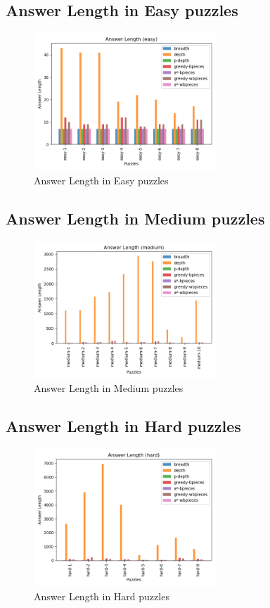 \documentclass[conference]{IEEEtran}
\begin{document}
\subsection{Answer Length in Easy puzzles}
\begin{figure}[H]
    \centerline{\includegraphics[width=260px]{../../graphics/answerLength-easy.png}}
    \caption{Answer Length in Easy puzzles}
\end{figure}

\subsection{Answer Length in Medium puzzles}
\begin{figure}[H]
    \centerline{\includegraphics[width=260px]{../../graphics/answerLength-medium.png}}
    \caption{Answer Length in Medium puzzles}
\end{figure}

\subsection{Answer Length in Hard puzzles}
\begin{figure}[H]
    \centerline{\includegraphics[width=260px]{../../graphics/answerLength-hard.png}}
    \caption{Answer Length in Hard puzzles}
\end{figure}
\end{document}
